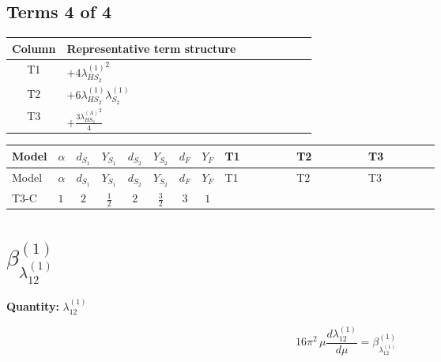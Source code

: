 \documentclass[8pt]{article}
\begin{document}
\begin{landscape}
\subsection*{Terms 4 of 4}
\begin{center}
\begin{tabular}{@{}c >{\raggedright\arraybackslash}p{0.82\linewidth}@{}}
\toprule
Column & Representative term structure \\
\midrule
T1 & \(\displaystyle +4 {\lambda_{HS_2}^{(1)}}^2\) \\
\midrule
T2 & \(\displaystyle +6 {\lambda_{HS_2}^{(1)}} {\lambda_{S_2}^{(1)}}\) \\
\midrule
T3 & \(\displaystyle +\frac{3 {\lambda_{HS_2}^{(A)}}^2}{4}\) \\
\midrule
\bottomrule
\end{tabular}
\end{center}
\smallskip
\tiny
\begin{longtable}{@{}llcccccc >{\raggedright\arraybackslash}p{0.21\linewidth} >{\raggedright\arraybackslash}p{0.21\linewidth} >{\raggedright\arraybackslash}p{0.21\linewidth}@{}}
\toprule
Model & $\alpha$ & $d_{S_1}$ & $Y_{S_1}$ & $d_{S_2}$ & $Y_{S_2}$ & $d_F$ & $Y_F$ & T1 & T2 & T3 \\
\midrule
\endfirsthead
\toprule
Model & $\alpha$ & $d_{S_1}$ & $Y_{S_1}$ & $d_{S_2}$ & $Y_{S_2}$ & $d_F$ & $Y_F$ & T1 & T2 & T3 \\
\midrule
\endhead
T3-C & $1$ & $2$ & $\frac{1}{2}$ & $2$ & $\frac{3}{2}$ & $3$ & $1$ & \scriptsize\adjustbox{max width=\linewidth}{$\begin{gathered} +4 {\lambda_{HS_2}^{(1)}}^2\end{gathered}$} & \scriptsize\adjustbox{max width=\linewidth}{$\begin{gathered} +6 {\lambda_{HS_2}^{(1)}} {\lambda_{S_2}^{(1)}}\end{gathered}$} & \scriptsize\adjustbox{max width=\linewidth}{$\begin{gathered} +\frac{3 {\lambda_{HS_2}^{(A)}}^2}{4}\end{gathered}$} \\
\midrule
\bottomrule
\end{longtable}
\clearpage
\section*{$\beta_{\lambda_{12}^{(1)}}^{(1)}$}
\noindent\textbf{Quantity: }$\lambda_{12}^{(1)}$\par\smallskip
\[16\pi^2\,\mu\frac{d \lambda_{12}^{(1)}}{d\mu}=\beta_{\lambda_{12}^{(1)}}^{(1)}\]

\end{landscape}
\end{document}
